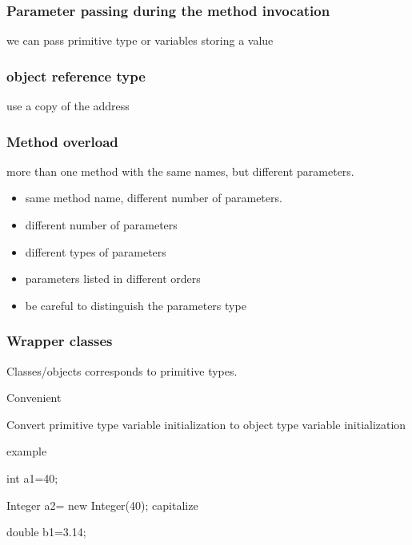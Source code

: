 \documentclass[
  paper=a4,
  ,captions=tableheading
]{scrartcl}
\begin{document}
\hypertarget{parameter-passing-during-the-method-invocation}{%
\subsubsection{Parameter passing during the method
invocation}\label{parameter-passing-during-the-method-invocation}}

we can pass primitive type or variables storing a value

\hypertarget{object-reference-type}{%
\subsubsection{object reference type}\label{object-reference-type}}

use a copy of the address

\hypertarget{method-overload}{%
\subsubsection{Method overload}\label{method-overload}}

more than one method with the same names, but different parameters.

\begin{itemize}
\item
  same method name, different number of parameters.
\item
  different number of parameters
\item
  different types of parameters
\item
  parameters listed in different orders
\item
  be careful to distinguish the parameters type
\end{itemize}

\hypertarget{wrapper-classes}{%
\subsubsection{Wrapper classes}\label{wrapper-classes}}

Classes/objects corresponds to primitive types.

Convenient

Convert primitive type variable initialization to object type variable
initialization

example

int a1=40;

Integer a2= new Integer(40); capitalize

double b1=3.14;
\end{document}
